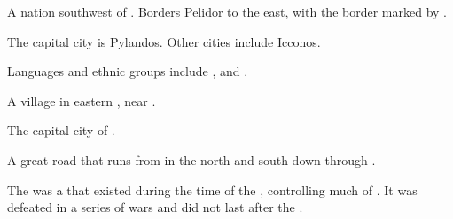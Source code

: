 \begin{gloss}
\begin{comment}
\paragraph{\Scyrum}
\end{comment}
\gitem{\Scyrum}
A nation southwest of \Velcad{}. 
Borders Pelidor to the east, with the border marked by . 

The capital city is Pylandos. 
Other cities include Icconos. 

Languages and ethnic groups include \Tepharin, \Samurin{} and \Ortic.  





\begin{subgloss}
  \begin{comment}
  \subparagraph{\Bryndwin}
  \end{comment}
  \gitem{\Bryndwin}
  A village in eastern \Scyrum, near . 

  
  
  
  
  
  \begin{comment}
  \subparagraph{\Pylandos}
  \end{comment}
  \gitem{\Pylandos}
  The capital city of \Scyrum. 

  
  
  
  
  
  \begin{comment}
  \subparagraph{\Pylandos{} Road}
  \end{comment}
  A great road that runs from \Pylandos{} in the north and south down through \Scyrum. 
\end{subgloss}









\begin{comment}
\paragraph{\Shurco}
\end{comment}
\gitem{\Shurco}
\index{\Shurcarie}
The \Shurcarie{} was a \scathaese{}   that existed during the time of the , controlling much of \DurcacContinent. 
It was defeated in a series of wars and did not last after the . 


\end{gloss}

